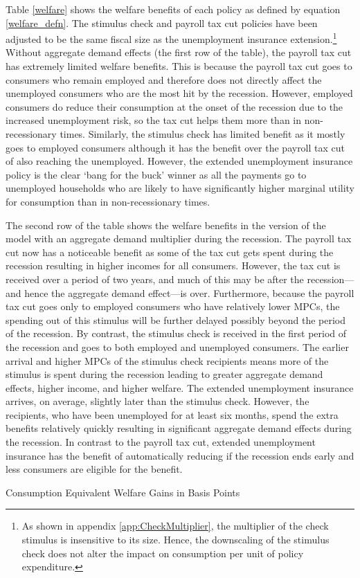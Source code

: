 \documentclass[../HAFiscal]{subfiles}
\begin{document}
Table \ref{welfare} shows the welfare benefits of each policy as defined by equation \eqref{welfare_defn}. The stimulus check and payroll tax cut policies have been adjusted to be the same fiscal size as the unemployment insurance extension.\footnote{As shown in appendix \ref{app:CheckMultiplier}, the multiplier of the check stimulus is insensitive to its size. Hence, the downscaling of the stimulus check does not alter the impact on consumption per unit of policy expenditure.} Without aggregate demand effects (the first row of the table), the payroll tax cut has extremely limited welfare benefits. This is because the payroll tax cut goes to consumers who remain employed and therefore does not directly affect the unemployed consumers who are the most hit by the recession. However, employed consumers do reduce their consumption at the onset of the recession due to the increased unemployment risk, so the tax cut helps them more than in non-recessionary times.  Similarly, the stimulus check has limited benefit as it mostly goes to employed consumers although it has the benefit over the payroll tax cut of also reaching the unemployed. However, the extended unemployment insurance policy is the clear `bang for the buck' winner as all the payments go to unemployed households who are likely to have significantly higher marginal utility for consumption than in non-recessionary times.

The second row of the table shows the welfare benefits in the version of the model with an aggregate demand multiplier during the recession. The payroll tax cut now has a noticeable benefit as some of the tax cut gets spent during the recession resulting in higher incomes for all consumers. However, the tax cut is received over a period of two years, and much of this may be after the recession---and hence the aggregate demand effect---is over. Furthermore, because the payroll tax cut goes only to employed consumers who have relatively lower MPCs, the spending out of this stimulus will be further delayed possibly beyond the period of the recession. By contrast, the stimulus check is received in the first period of the recession and goes to both employed and unemployed consumers. The earlier arrival and higher MPCs of the stimulus check recipients means more of the stimulus is spent during the recession leading to greater aggregate demand effects, higher income, and higher welfare. The extended unemployment insurance arrives, on average, slightly later than the stimulus check. However, the recipients, who have been unemployed for at least six months, spend the extra benefits relatively quickly resulting in significant aggregate demand effects during the recession. In contrast to the payroll tax cut, extended unemployment insurance has the benefit of automatically reducing if the recession ends early and less consumers are eligible for the benefit.

\begin{table}[ht] 
	\center
	
	\caption{Consumption Equivalent Welfare Gains in Basis Points }
	\label{welfare}
\end{table}
\end{document}
